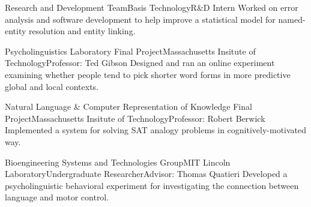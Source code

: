 \documentclass[11pt,letter]{moderncv}
\begin{document}
\raggedright
{}%
{Research and Development Team}{Basis Technology}{R\&D Intern}{}{
%
Worked on error analysis and software development to help improve a statistical model for named-entity resolution and entity linking.
%
}
\vspace*{0.2em}

\raggedright
{}%
{Psycholinguistics Laboratory Final Project}{Massachusetts Insitute of Technology}{}{Professor: Ted Gibson}{
%
Designed and ran an online experiment examining whether people tend to pick shorter word forms in more predictive global and local contexts.
%
}
\vspace*{0.2em}

\raggedright
{}%
{Natural Language \& Computer Representation of Knowledge Final Project}{Massachusetts Insitute of Technology}{}{Professor: Robert Berwick}{
%
Implemented a system for solving SAT analogy problems in cognitively-motivated way.
%
}
\vspace*{0.2em}

\raggedright
{}%
{Bioengineering Systems and Technologies Group}{MIT Lincoln Laboratory}{Undergraduate Researcher}{Advisor: Thomas Quatieri}{
%
Developed a psycholinguistic behavioral experiment for investigating the connection between language and motor control.
%
}


%
%


\vspace*{0.25em}
\end{document}
